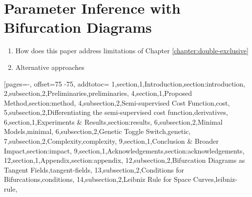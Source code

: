 \chapter{Parameter Inference with Bifurcation Diagrams}
\label{chapter:inference}
\begin{enumerate}
    \item How does this paper address limitations of Chapter \ref{chapter:double-exclusive} 
    \item Alternative approaches
\end{enumerate}

[pages=-, offset=75 -75, addtotoc={
        1,section,1,Introduction,section:introduction,
        2,subsection,2,Preliminaries,preliminaries,
        4,section,1,Proposed Method,section:method,
        4,subsection,2,Semi-supervised Cost Function,cost,
        5,subsection,2,Differentiating the semi-supervised cost function,derivatives,
        6,section,1,Experiments \& Results,section:results,
        6,subsection,2,Minimal Models,minimal,
        6,subsection,2,Genetic Toggle Switch,genetic,
        7,subsection,2,Complexity,complexity,
        9,section,1,Conclusion \& Broader Impact,section:impact,
        9,section,1,Acknowledgements,section:acknowledgements,
        12,section,1,Appendix,section:appendix,
        12,subsection,2,Bifurcation Diagrams as Tangent Fields,tangent-fields,
        13,subsection,2,Conditions for Bifurcations,conditions,
        14,subsection,2,Leibniz Rule for Space Curves,leibniz-rule},
